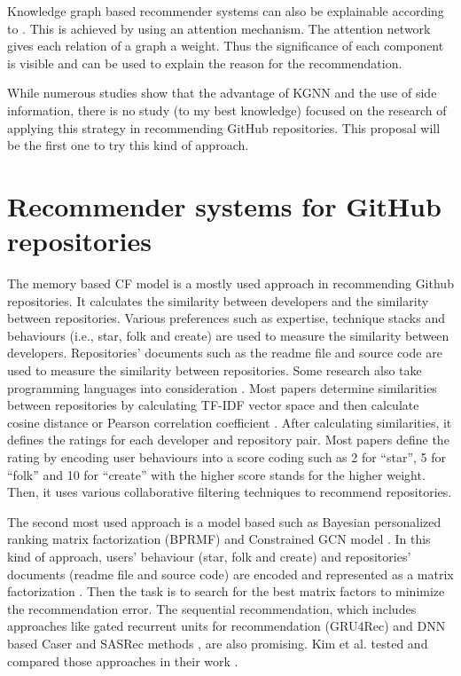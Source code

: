 \documentclass[11pt,twoside]{report}
\begin{document}
Knowledge graph based recommender systems can also be explainable according to \cite{guo_survey_2020}. This is achieved by using an attention mechanism. The attention network gives each relation of a graph a weight. Thus the significance of each component is visible and can be used to explain the reason for the recommendation.

While numerous studies show that the advantage of KGNN and the use of side information, there is no study (to my best knowledge) focused on the research of applying this strategy in recommending GitHub repositories. This proposal will be the first one to try this kind of approach.


\section{Recommender systems for GitHub repositories}
The memory based CF model is a mostly used approach in recommending Github repositories. It calculates the similarity between developers and the similarity between repositories. Various preferences such as expertise, technique stacks and behaviours (i.e., star, folk and create) are used to measure the similarity between developers. Repositories' documents such as the readme file and source code are used to measure the similarity between repositories. Some research also take programming languages into consideration \cite{inka_open_2018, sun_personalized_2018}. Most papers determine similarities between repositories by calculating TF-IDF vector space and then calculate cosine distance or Pearson correlation coefficient \cite{mansur_review_nodate, kim_sequential_2021}. After calculating similarities, it defines the ratings for each developer and repository pair. Most papers define the rating by encoding user behaviours into a score coding such as 2 for “star”, 5 for “folk” and 10 for “create” with the higher score stands for the higher weight. Then, it uses various collaborative filtering techniques to recommend repositories.

The second most used approach is a model based such as Bayesian personalized ranking matrix factorization (BPRMF) \cite{jiang_open_2017} and Constrained GCN model \cite{shao_paper2repo_2020}. In this kind of approach, users’ behaviour (star, folk and create) and repositories’ documents (readme file and source code) are encoded and represented as a matrix factorization \cite{jiang_open_2017}. Then the task is to search for the best matrix factors to minimize the recommendation error. The sequential recommendation, which includes approaches like gated recurrent units for recommendation (GRU4Rec) and DNN based Caser and SASRec methods \cite{kim_sequential_2021}, are also promising. Kim et al. \cite{kim_sequential_2021} tested and compared those approaches in their work \cite{kim_sequential_2021}.
\end{document}
